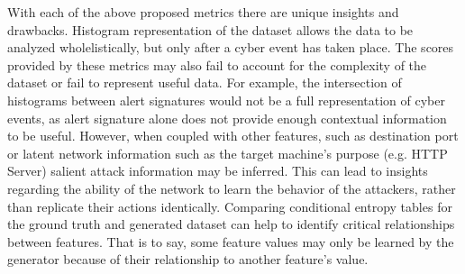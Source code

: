 With each of the above proposed metrics there are unique insights and drawbacks. Histogram representation of the dataset allows the data to be analyzed wholelistically, but only after a cyber event has taken place. The scores provided by these metrics may also fail to account for the complexity of the dataset or fail to represent useful data. For example, the intersection of histograms between alert signatures would not be a full representation of cyber events, as alert signature alone does not provide enough contextual information to be useful. However, when coupled with other features, such as destination port or latent network information such as the target machine's purpose (e.g. HTTP Server) salient attack information may be inferred. This can lead to insights regarding the ability of the network to learn the behavior of the attackers, rather than replicate their actions identically. Comparing conditional entropy tables for the ground truth and generated dataset can help to identify critical relationships between features. That is to say, some feature values may only be learned by the generator because of their relationship to another feature's value.

